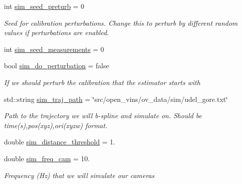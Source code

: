 \begin{DoxyCompactItemize}
int \hyperlink{structov__msckf_1_1VioManagerOptions_afe2c433c61d25c18901b089a2215114c}{sim\+\_\+seed\+\_\+preturb} = 0
\begin{DoxyCompactList}\small\item\em Seed for calibration perturbations. Change this to perturb by different random values if perturbations are enabled. \end{DoxyCompactList}\item 
int \hyperlink{structov__msckf_1_1VioManagerOptions_a9b3fee122a7d3b2069a424b5ef1b1155}{sim\+\_\+seed\+\_\+measurements} = 0
\item 
\mbox{\label{structov__msckf_1_1VioManagerOptions_a4d595d5277582b53d12ad75bc7a6ad57}} 
bool \hyperlink{structov__msckf_1_1VioManagerOptions_a4d595d5277582b53d12ad75bc7a6ad57}{sim\+\_\+do\+\_\+perturbation} = false
\begin{DoxyCompactList}\small\item\em If we should perturb the calibration that the estimator starts with \end{DoxyCompactList}\item 
\mbox{\label{structov__msckf_1_1VioManagerOptions_ab948eee26f7031d626297b172c9d183d}} 
std\+::string \hyperlink{structov__msckf_1_1VioManagerOptions_ab948eee26f7031d626297b172c9d183d}{sim\+\_\+traj\+\_\+path} = \char`\"{}src/open\+\_\+vins/ov\+\_\+data/sim/udel\+\_\+gore.\+txt\char`\"{}
\begin{DoxyCompactList}\small\item\em Path to the trajectory we will b-\/spline and simulate on. Should be time(s),pos(xyz),ori(xyzw) format. \end{DoxyCompactList}\item 
double \hyperlink{structov__msckf_1_1VioManagerOptions_a3b6af0048e6bb9b903088f30f9be7221}{sim\+\_\+distance\+\_\+threshold} = 1.
\item 
\mbox{\label{structov__msckf_1_1VioManagerOptions_a093cc163f266b0c013d7eda528bb1e80}} 
double \hyperlink{structov__msckf_1_1VioManagerOptions_a093cc163f266b0c013d7eda528bb1e80}{sim\+\_\+freq\+\_\+cam} = 10.
\begin{DoxyCompactList}\small\item\em Frequency (Hz) that we will simulate our cameras \end{DoxyCompactList}\item 

\end{DoxyCompactItemize}

